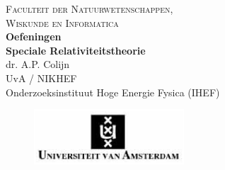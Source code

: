 \documentclass[12pt,twoside,a4paper,dutch]{article}
\begin{document}
%


\begin{center}
{\Large\textsc{Faculteit der Natuurwetenschappen, \\ Wiskunde en Informatica}}
\\[4cm]
{\Huge\bf Oefeningen \\ Speciale Relativiteitstheorie}
\\[1cm]
{\large dr. A.P. Colijn}
\\[0.1cm]
UvA / NIKHEF
\\[0.1cm]  
Onderzoeksinstituut Hoge Energie Fysica (IHEF) 
\\[6.5cm]
\end{center}

\normalsize

\begin{figure}[ht]
	\centering
		\includegraphics[width=0.5\textwidth]{oefeningen.pictures/UVA}
	\label{fig:UVA}
\end{figure}
%
\end{document}
